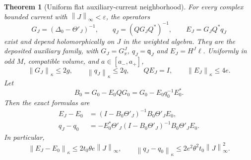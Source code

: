 \documentclass[11pt]{article}
\newtheorem{theorem}{Theorem}[section]
\theoremstyle{remark}
\newcommand{\norm}[1]{\left\|#1\right\|}
\begin{document}
\begin{theorem}[Uniform flat auxiliary-current neighborhood]
\label{current-neighborhood-theorem}
For every complex bounded current with
$\norm{J}_\infty<\varepsilon$, the operators
\begin{equation}
 G_J=(\Delta_0-\Theta'_J)^{-1},\qquad
 q_J=(QG_JQ^*)^{-1},\qquad E_J=G_JQ^*q_J
 \label{current-family}
\end{equation}
exist and depend holomorphically on $J$ in the weighted algebra. They
are the deposited auxiliary family, with
$G_J=G_\pi^J$, $q_J=\mathsf q_J$ and $E_J=H^J\ell$. Uniformly in odd $M$, compatible volume, and
$a\in[a_-,a_+]$,
\begin{equation}
 \norm{G_J}_\kappa\le2g,\qquad
 \norm{q_J}_\kappa\le2q,\qquad
 QE_J=I,\qquad\norm{E_J}_\kappa\le4e.
 \label{current-uniform-bounds}
\end{equation}
Let
\begin{equation}
 B_0=G_0-E_0QG_0=G_0-E_0q_0^{-1}E_0^*.
 \label{current-B0}
\end{equation}
Then the exact formulas are
\begin{align}
 E_J-E_0
   &=(I-B_0\Theta'_J)^{-1}B_0\Theta'_JE_0,
 \label{current-extension-remainder}\\
 q_J-q_0
   &=-E_0^*\Theta'_J(I-B_0\Theta'_J)^{-1}
                  B_0\Theta'_JE_0.
 \label{current-quadratic-remainder}
\end{align}
In particular,
\begin{equation}
 \norm{E_J-E_0}_\kappa\le2t_0\theta e\norm{J}_\infty,
 \qquad
 \norm{q_J-q_0}_\kappa\le
       2e^2\theta^2t_0\norm{J}_\infty^2.
 \label{current-remainder-bounds}
\end{equation}
\end{theorem}
\end{document}
